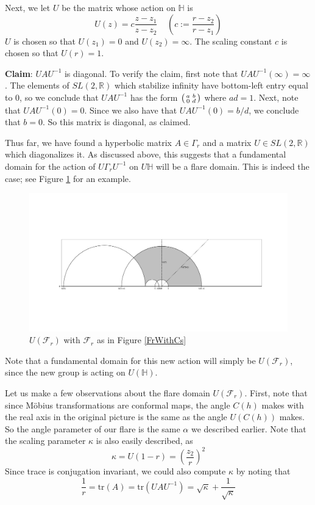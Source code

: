 \documentclass[]{article}
\begin{document}
Next, we let $U$ be the matrix whose action on $\mathbb{H}$ is
$$
U(z) = c\frac{z - z_1}{z - z_2} ~~~~~ \left( c := \frac{r - z_2}{r - z_1} \right)
$$
$U$ is chosen so that $U(z_1) = 0$ and $U(z_2) = \infty$.
The scaling constant $c$ is chosen so that $U(r) = 1$.

\textbf{Claim}: $UAU^{-1}$ is diagonal.
To verify the claim, first note that $UAU^{-1}(\infty) = \infty$.
The elements of $SL(2, \mathbb{R})$ which stabilize infinity have bottom-left entry equal to $0$, so we conclude that $UAU^{-1}$ has the form
$\begin{psmallmatrix}
	a & b \\
	0 & d
\end{psmallmatrix}$
where $ad = 1$.
Next, note that $UAU^{-1}(0) = 0$.
Since we also have that $UAU^{-1}(0) = b/d$, we conclude that $b = 0$.
So this matrix is diagonal, as claimed.

Thus far, we have found a hyperbolic matrix $A \in \Gamma_r$ and a matrix $U \in SL(2, \mathbb{R})$ which diagonalizes it.
As discussed above, this suggests that a fundamental domain for the action of $U\Gamma_rU^{-1}$ on $U\mathbb{H}$ will be a flare domain.
This is indeed the case; see Figure \ref{UFr} for an example.
\begin{figure}[h]
	\centering
	\includegraphics[trim=150 210 130 230, clip, width=\linewidth]{U_F_r.pdf}
	\caption{$U(\mathcal{F}_r)$ with $\mathcal{F}_r$ as in Figure \ref{FrWithCs}}
	\label{UFr}
\end{figure}
Note that a fundamental domain for this new action will simply be $U(\mathcal{F}_r)$, since the new group is acting on $U(\mathbb{H})$.

Let us make a few observations about the flare domain $U(\mathcal{F}_r)$.
First, note that since M\"obius transformations are conformal maps, the angle $C(h)$ makes with the real axis in the original picture is the same as the angle $U(C(h))$ makes.
So the angle parameter of our flare is the same $\alpha$ we described earlier.
Note that the scaling parameter $\kappa$ is also easily described, as
$$
\kappa = U(1-r) = \left(\frac{z_2}{r}\right)^2
$$
Since trace is conjugation invariant, we could also compute $\kappa$ by noting that
$$
\frac{1}{r} = \text{tr}(A) = \text{tr}(UAU^{-1}) = \sqrt{\kappa} + \frac{1}{\sqrt{\kappa}}
$$
\end{document}
